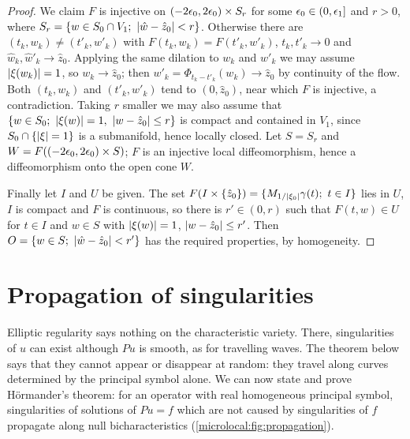 \begin{proof}
  We claim $F$ is injective on $(-2\epsilon_0,2\epsilon_0)\times S_r$ for some
  $\epsilon_0\in(0,\epsilon_1]$ and $r>0$, where $S_r=\{w\in S_0\cap V_1;\
  \lvert \hat w-\hat z_0\rvert<r\}$. Otherwise there are $(t_k,w_k)\ne(t'_k,w'_k)$ with
  $F(t_k,w_k)=F(t'_k,w'_k)$, $t_k,t'_k\to0$ and $\hat w_k,\hat w'_k\to\hat z_0$.
  Applying the same dilation to $w_k$ and $w'_k$ we may assume $\lvert \xi(w_k)\rvert=1$,
  so $w_k\to\hat z_0$; then $w'_k=\Phi_{t_k-t'_k}(w_k)\to\hat z_0$ by continuity of
  the flow. Both $(t_k,w_k)$ and $(t'_k,w'_k)$ tend to $(0,\hat z_0)$, near which
  $F$ is injective, a contradiction. Taking $r$ smaller we may also assume
  that $\{w\in S_0;\ \abs{\xi(w)}=1,\ \abs{w-\hat z_0}\le r\}$ is compact and
  contained in $V_1$, since $S_0\cap\{\lvert \xi\rvert=1\}$ is a submanifold, hence
  locally closed. Let $S=S_r$ and
  $W=F((-2\epsilon_0,2\epsilon_0)\times S)$; $F$ is an injective local diffeomorphism,
  hence a diffeomorphism onto the open cone $W$.

  Finally let $I$ and $U$ be given. The set
  $F(I\times\{\hat z_0\})=\{M_{1/\lvert \xi_0\rvert}\gamma(t);\ t\in I\}$ lies in $U$, $I$ is
  compact and $F$ is continuous, so there is $r'\in(0,r)$ such that
  $F(t,w)\in U$ for $t\in I$ and $w\in S$ with $\lvert \xi(w)\rvert=1$,
  $\lvert w-\hat z_0\rvert\le r'$. Then $O=\{w\in S;\ \lvert \hat w-\hat z_0\rvert<r'\}$ has
  the required properties, by homogeneity.
\end{proof}

\section{Propagation of singularities}\label{microlocal:sec:propagation}

Elliptic regularity says nothing on the characteristic variety. There,
singularities of $u$ can exist although $Pu$ is smooth, as for travelling
waves. The theorem below says that they cannot appear or disappear at
random: they travel along curves determined by the principal symbol alone.
We can now state and prove H\"ormander's theorem: for an operator with
real homogeneous principal symbol, singularities of solutions of $Pu=f$ which
are not caused by singularities of $f$ propagate along null bicharacteristics
(\cref{microlocal:fig:propagation}).

